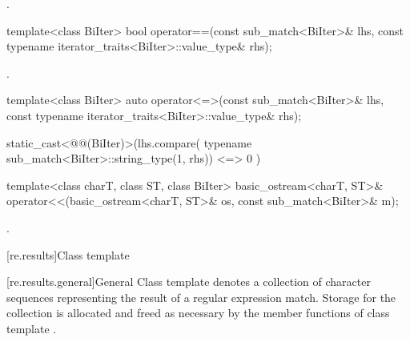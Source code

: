 \begin{itemdescr}
\pnum
\returns
{}.
\end{itemdescr}

%
\begin{itemdecl}
template<class BiIter>
  bool operator==(const sub_match<BiIter>& lhs,
                  const typename iterator_traits<BiIter>::value_type& rhs);
\end{itemdecl}

\begin{itemdescr}
\pnum
\returns
{}.
\end{itemdescr}

%
\begin{itemdecl}
template<class BiIter>
  auto operator<=>(const sub_match<BiIter>& lhs,
                   const typename iterator_traits<BiIter>::value_type& rhs);
\end{itemdecl}

\begin{itemdescr}
\pnum
\returns
\begin{codeblock}
static_cast<@@(BiIter)>(lhs.compare(
    typename sub_match<BiIter>::string_type(1, rhs))
      <=> 0
    )
\end{codeblock}
\end{itemdescr}

%
%
\begin{itemdecl}
template<class charT, class ST, class BiIter>
  basic_ostream<charT, ST>&
    operator<<(basic_ostream<charT, ST>& os, const sub_match<BiIter>& m);
\end{itemdecl}

\begin{itemdescr}
\pnum
\returns
{}.
\end{itemdescr}

[re.results]{Class template }

[re.results.general]{General}
\pnum
{}%
Class template  denotes a collection of character
sequences representing the result of a regular expression
match. Storage for the collection is allocated and freed as necessary
by the member functions of class template .

